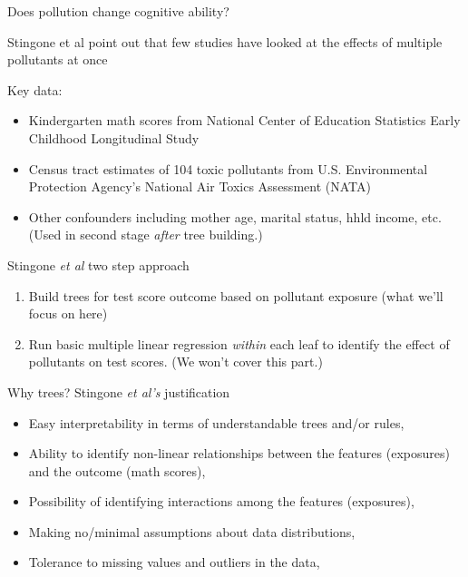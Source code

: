 \documentclass[mathserif, aspectratio=169]{beamer}
\begin{document}
\begin{frame}{Does pollution change cognitive ability?}

Stingone et al point out that few studies have looked at the effects of multiple pollutants at once

Key data:
\begin{itemize}
\item Kindergarten math scores from National Center of Education Statistics Early Childhood Longitudinal Study
\item Census tract estimates of 104 toxic pollutants from U.S. Environmental Protection Agency's National Air Toxics Assessment (NATA)
\item Other confounders including mother age, marital status, hhld income, etc.  (Used in second stage \textit{after} tree building.)
\end{itemize}

\end{frame}

\begin{frame}{Stingone \textit{et al} two step approach}

\begin{enumerate}
\item Build trees for test score outcome based on pollutant exposure (what we'll focus on here)
\item Run basic multiple linear regression \textit{within} each leaf to identify the effect of pollutants on test scores.  (We won't cover this part.)
\end{enumerate}
\end{frame}

\begin{frame}{Why trees?  Stingone \textit{et al's} justification}

\begin{itemize}
\item Easy interpretability in terms of understandable trees and/or rules, 
\item Ability to identify non-linear relationships between the features (exposures) and the outcome (math scores), 
\item Possibility of identifying interactions among the features (exposures), 
\item Making no/minimal assumptions about data distributions, 
\item Tolerance to missing values and outliers in the data, 
\end{itemize}
\end{frame}
\end{document}
